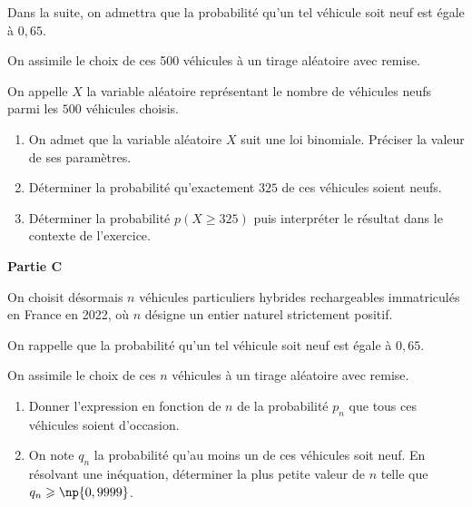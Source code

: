 Dans la suite, on admettra que la probabilité qu'un tel véhicule soit neuf est égale à $0,65$.

On assimile le choix de ces 500 véhicules à un tirage aléatoire avec remise.

On appelle $X$ la variable aléatoire représentant le nombre de véhicules neufs parmi les $500$ véhicules choisis.

\medskip

\begin{enumerate}
\item On admet que la variable aléatoire $X$ suit une loi binomiale. Préciser la valeur de ses paramètres.
\item Déterminer la probabilité qu'exactement $325$ de ces véhicules soient neufs.
\item Déterminer la probabilité $p(X \geq 325)$ puis interpréter le résultat dans le contexte de l'exercice.
\end{enumerate}

\textbf{Partie C}

\medskip

On choisit désormais $n$ véhicules particuliers hybrides rechargeables immatriculés en France en 2022, où $n$ désigne un entier naturel strictement positif.

On rappelle que la probabilité qu'un tel véhicule soit neuf est égale à $0,65$.

On assimile le choix de ces $n$ véhicules à un tirage aléatoire avec remise.

\medskip

\begin{enumerate}
\item Donner l'expression en fonction de $n$ de la probabilité $p_{n}$ que tous ces véhicules soient d'occasion.

\item On note $q_{n}$ la probabilité qu'au moins un de ces véhicules soit neuf. En résolvant une inéquation, déterminer la plus petite valeur de $n$ telle que $q_{n} \geqslant \np{0,9999}$.
\end{enumerate}
